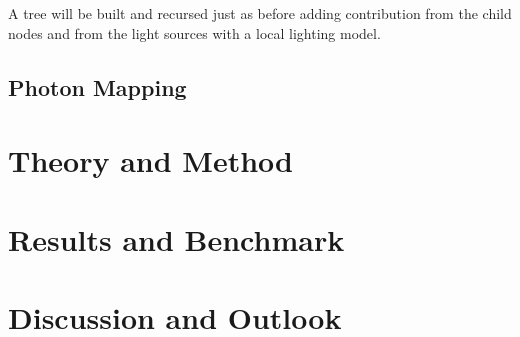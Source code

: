 \documentclass[a4paper, twocolumn]{article}
\begin{document}
    A tree will be built and recursed just as before adding contribution from the child nodes and from the light sources with a local lighting model. 
    \subsection{Photon Mapping} \label{sec:photon_mapping}

    \clearpage

    \section{Theory and Method} \label{sec:theory_and_method}

    \section{Results and Benchmark} \label{sec:results_and_benchmark}

    \section{Discussion and Outlook} \label{sec:discussion_and_outlook}

    \newpage %
    \nocite{*} %
    
    
\end{document}
